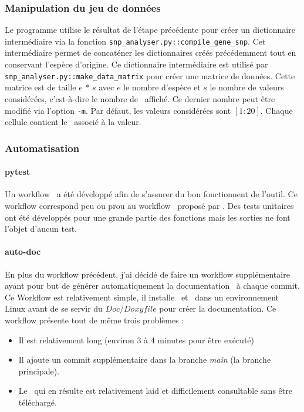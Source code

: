 \documentclass[../main]{subfiles} %
\begin{document}
\subsubsection{Manipulation du jeu de données}
Le programme utilise le résultat de l’étape précédente pour créer un dictionnaire intermédiaire via la fonction \lstinline{snp_analyser.py::compile_gene_snp}. Cet intermédiaire permet de concaténer les dictionnaires créés précédemment tout en conservant l’espèce d’origine.
Ce dictionnaire intermédiaire est utilisé par \lstinline{snp_analyser.py::make_data_matrix} pour créer une matrice de données. Cette matrice est de taille $e$ * $s$  avec $e$ le nombre d’espèce et $s$ le nombre de valeurs considérées, c'est-à-dire le nombre de \NbSNP affiché. Ce dernier nombre peut être modifié via l’option \lstinline{-m}. Par défaut, les valeurs considérées sont $[1:20]$. Chaque cellule contient le \GNSPge associé à la valeur.


\subsubsection{Automatisation}

\paragraph{pytest}
\label{sec:SnpPytest}
Un workflow \pytest a été développé afin de s’assurer du bon fonctionnent de l’outil. Ce workflow correspond peu ou prou au workflow \pytest proposé par \GitHub. Des tests unitaires ont été développés pour une grande partie des fonctions mais les sorties ne font l’objet d’aucun test.

\paragraph{auto-doc}
\label{sec:AutoDoc}
En plus du workflow précédent, j’ai décidé de faire un workflow supplémentaire ayant pour but de générer automatiquement la documentation \Doxygen à chaque \gls{commit}. Ce Workflow est relativement simple, il installe \Doxygen et \Latex dans un environnement Linux avant de se servir du $Doc/Doxyfile$ pour créer la documentation. Ce workflow présente tout de même trois problèmes :
\begin{itemize}
\item Il est relativement long (environ 3 à 4 minutes pour être exécuté)
\item Il ajoute un \gls{commit} supplémentaire dans la branche \textit{main} (la branche principale).
\item Le \pdf qui en résulte est relativement laid et difficilement consultable sans être téléchargé.

\end{itemize}
\end{document}
